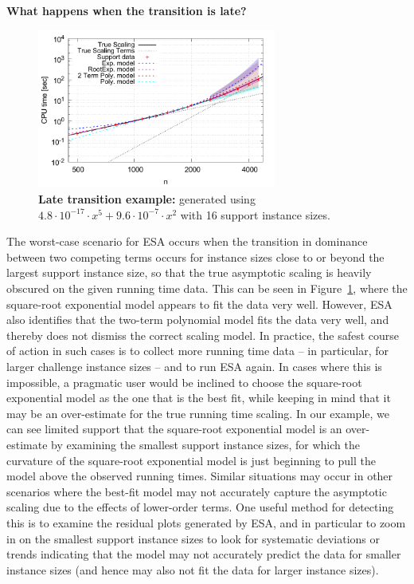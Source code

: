 \documentclass[aic]{iosart2x}
\begin{document}
\textbf{What happens when the transition is late?}
\begin{figure}[t]
\centering
\includegraphics[width=0.7\textwidth]{fittedModels-2-5-16-16s.pdf}
\caption{\textbf{Late transition example:} generated using $4.8\cdot 10^{-17} \cdot x^5 + 9.6\cdot 10^{-7} \cdot x^2$ with 16 support instance sizes.}
\label{fig:AA-competing-2-5-16-16s}
\end{figure}
The worst-case scenario for ESA occurs when the transition in dominance between two competing terms occurs for instance sizes close to or beyond the largest support instance size, so that the true asymptotic scaling is heavily obscured on the given running time data. 
This can be seen in Figure~\ref{fig:AA-competing-2-5-16-16s}, where the square-root exponential model appears to fit the data very well. 
However, ESA also identifies that the two-term polynomial model fits the data very well, and thereby does not dismiss the correct scaling model.
In practice, the safest course of action in such cases is to collect more running time data -- in particular, for larger challenge instance sizes -- and to run ESA again. 
In cases where this is impossible, a pragmatic user would be inclined to choose the square-root exponential model as the one that is the best fit, while keeping in mind that it may be an over-estimate for the true running time scaling. 
In our example, we can see limited support that the square-root exponential model is an over-estimate by examining the smallest support instance sizes, for which the curvature of the square-root exponential model is just beginning to pull the model above the observed running times.
Similar situations may occur in other scenarios where the best-fit model may not accurately capture the asymptotic scaling due to the effects of lower-order terms. One useful method for detecting this is to examine the residual plots generated by ESA, and in particular to zoom in on the smallest support instance sizes to look for systematic deviations or trends indicating that the model may not accurately predict the data for smaller instance sizes (and hence may also not fit the data for larger instance sizes).
\end{document}
